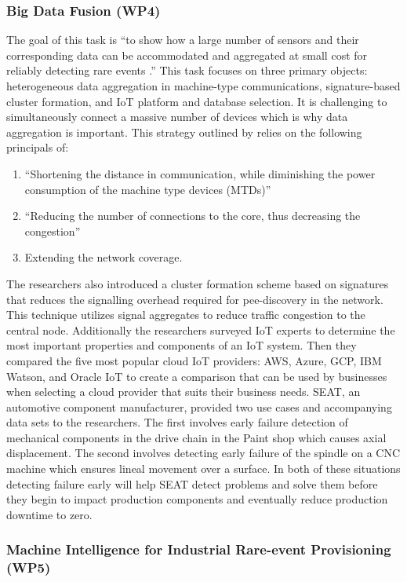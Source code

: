 \subsubsection{Big Data Fusion (WP4)}
\label{ref_wp4}
The goal of this task is \enquote{to show how a large number of sensors and their corresponding data can be  accommodated and aggregated at small cost for reliably detecting rare events \parencite{wp4.1}.} This task focuses on three primary objects: heterogeneous data aggregation in machine-type communications, signature-based cluster formation, and IoT platform and database selection. It is challenging to simultaneously connect a massive number of devices which is why data aggregation is important. This strategy outlined by  relies on the following principals of:
\begin{enumerate}
  \item \enquote{Shortening the distance in communication, while diminishing the power consumption of the machine type devices (MTDs)}\parencite{massive-machine}
  \item \enquote{Reducing the number of connections to the core, thus decreasing the congestion}\parencite{massive-machine}
  \item Extending the network coverage.
\end{enumerate}
The researchers also introduced a cluster formation scheme based on signatures that reduces the signalling overhead required for pee-discovery in the network. This technique utilizes signal aggregates to reduce traffic congestion to the central node. Additionally the researchers surveyed IoT experts to determine the most important properties and components of an IoT system. Then they compared the five most popular cloud IoT providers: AWS, Azure, GCP, IBM Watson, and Oracle IoT to create a comparison that can be used by businesses when selecting a cloud provider that suits their business needs. SEAT, an automotive component manufacturer, provided two use cases and accompanying data sets to the researchers. The first involves early failure detection of mechanical components in the drive chain in the Paint shop which causes axial displacement. The second involves detecting early failure of the spindle on a CNC machine which ensures lineal movement over a surface. In both of these situations detecting failure early will help SEAT detect problems and solve them before they begin to impact production components and eventually reduce production downtime to zero. 

\subsubsection{Machine Intelligence for Industrial Rare-event Provisioning (WP5)}

